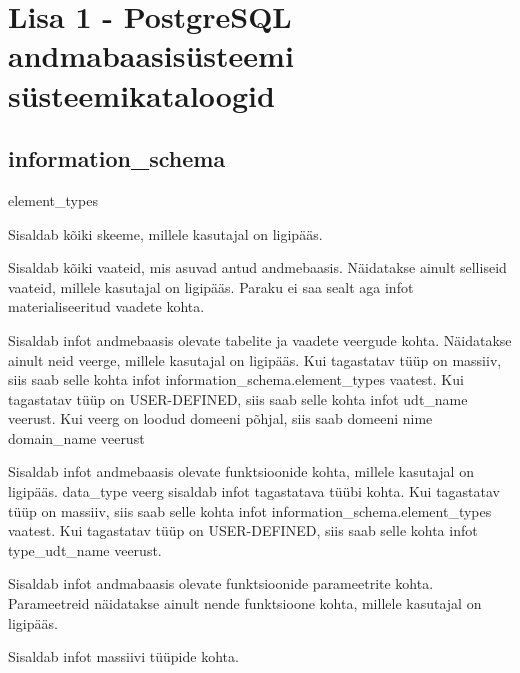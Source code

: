 \documentclass[a4paper,12pt]{article} %
\begin{document}
\pagebreak




\pagebreak


\section*{Lisa 1 - PostgreSQL andmabaasisüsteemi süsteemikataloogid}
\label{lisa_postgresql_kataloogid}
\subsection*{information\_schema}
\begin{labeling}{element\_types}
\item [schemata] Sisaldab kõiki skeeme, millele kasutajal on ligipääs.
\item [views] Sisaldab kõiki vaateid, mis asuvad antud andmebaasis. Näidatakse ainult selliseid vaateid, millele kasutajal on ligipääs. Paraku ei saa sealt aga infot materialiseeritud vaadete kohta.
\item [columns] Sisaldab infot andmebaasis olevate tabelite ja vaadete veergude kohta. Näidatakse ainult neid veerge, millele kasutajal on ligipääs. Kui tagastatav tüüp on massiiv, siis saab selle kohta infot information\_schema.element\_types vaatest. Kui tagastatav tüüp on USER-DEFINED, siis saab selle kohta infot udt\_name veerust. Kui veerg on loodud domeeni põhjal, siis saab domeeni nime domain\_name veerust
\item [routines] Sisaldab infot andmebaasis olevate funktsioonide kohta, millele kasutajal on ligipääs. data\_type veerg sisaldab infot tagastatava tüübi kohta. Kui tagastatav tüüp on massiiv, siis saab selle kohta infot information\_schema.element\_types vaatest. Kui tagastatav tüüp on USER-DEFINED, siis saab selle kohta infot type\_udt\_name veerust.
\item [parameters] Sisaldab infot andmabaasis olevate funktsioonide parameetrite kohta. Parameetreid näidatakse ainult nende funktsioone kohta, millele kasutajal on ligipääs.
\item [element\_types] Sisaldab infot massiivi tüüpide kohta.
\end{labeling}
\cite{PostgreSQLInformationSchema}
\end{document}
